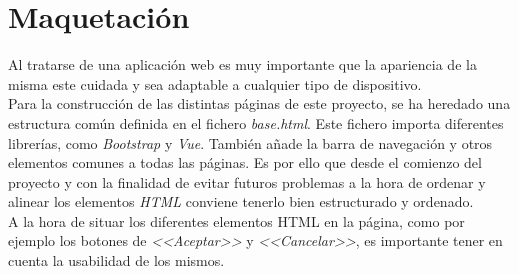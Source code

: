\section{Maquetación}
Al tratarse de una aplicación web es muy importante que la apariencia de la misma este cuidada y sea adaptable a cualquier tipo de dispositivo.
\\

Para la construcción de las distintas páginas de este proyecto, se ha heredado una estructura común definida en el fichero \textit{base.html}. Este fichero importa diferentes librerías, como \textit{Bootstrap} y \textit{Vue}. También añade la barra de navegación y otros elementos comunes a todas las páginas. Es por ello que desde el comienzo del proyecto y con la finalidad de evitar futuros problemas a la hora de ordenar y alinear los elementos \textit{HTML} conviene tenerlo bien estructurado y ordenado. 
\\
A la hora de situar los diferentes elementos HTML en la página, como por ejemplo los botones de \textit{<<Aceptar>>} y \textit{<<Cancelar>>}, es importante tener en cuenta la usabilidad de los mismos.

